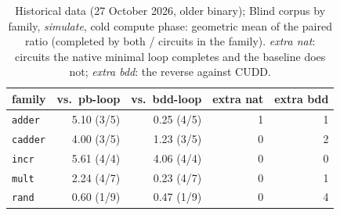 \begin{table}[t]
\centering\small
\caption{Historical data (27 October 2026, older binary); Blind corpus by family, \emph{simulate}, cold compute phase: geometric mean of the paired ratio (completed by both / circuits in the family). \emph{extra nat}: circuits the native minimal loop completes and the baseline does not; \emph{extra bdd}: the reverse against CUDD.}
\label{tab:families}
\begin{tabular}{lrrrr}
\toprule
family & vs.\ \textsf{pb-loop} & vs.\ \textsf{bdd-loop} & extra nat & extra bdd \\
\midrule
\texttt{adder} & 5.10 (3/5) & 0.25 (4/5) & 1 & 1 \\
\texttt{cadder} & 4.00 (3/5) & 1.23 (3/5) & 0 & 2 \\
\texttt{incr} & 5.61 (4/4) & 4.06 (4/4) & 0 & 0 \\
\texttt{mult} & 2.24 (4/7) & 0.23 (4/7) & 0 & 1 \\
\texttt{rand} & 0.60 (1/9) & 0.47 (1/9) & 0 & 4 \\
\bottomrule
\end{tabular}
\end{table}
